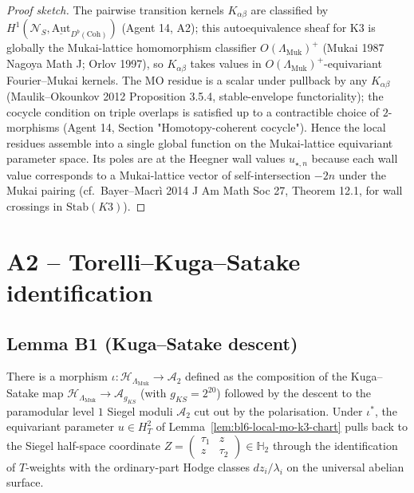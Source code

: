 \begin{proof}[Proof sketch]
The pairwise transition kernels $K_{\alpha \beta}$ are classified
by $H^{1}(\mathcal N_{S}, \underline{\mathrm{Aut}}_{D^{b}(\mathrm{Coh})})$
(Agent 14, A2); this autoequivalence sheaf for K3 is globally the
Mukai-lattice homomorphism classifier
$O(\Lambda_{\mathrm{Muk}})^{+}$ (Mukai 1987 Nagoya Math J; Orlov
1997), so $K_{\alpha \beta}$ takes values in
$O(\Lambda_{\mathrm{Muk}})^{+}$-equivariant Fourier--Mukai kernels.
The MO residue is a scalar under pullback by any
$K_{\alpha \beta}$ (Maulik--Okounkov 2012 Proposition 3.5.4,
stable-envelope functoriality); the cocycle condition on triple
overlaps is satisfied up to a contractible choice of $2$-morphisms
(Agent 14, Section "Homotopy-coherent cocycle").  Hence the local
residues assemble into a single global function on the Mukai-lattice
equivariant parameter space.  Its poles are at the Heegner wall
values $u_{\star, n}$ because each wall value corresponds to a
Mukai-lattice vector of self-intersection $-2n$ under the Mukai
pairing (cf.\ Bayer--Macr\`i 2014 J Am Math Soc 27, Theorem 12.1,
for wall crossings in $\mathrm{Stab}(K3)$).
\end{proof}

\section*{A2 -- Torelli--Kuga--Satake identification}

\subsection*{Lemma B1 (Kuga--Satake descent)}

\begin{lemma}
\label{lem:bl6-kuga-satake-pullback}
There is a morphism $\iota\colon
\mathcal H_{\Lambda_{\mathrm{Muk}}} \to \mathcal A_{2}$
defined as the composition of the Kuga--Satake map
$\mathcal H_{\Lambda_{\mathrm{Muk}}} \to \mathcal A_{g_{KS}}$
(with $g_{KS} = 2^{20}$) followed by the descent to the
paramodular level $1$ Siegel moduli $\mathcal A_{2}$ cut out by the
polarisation.  Under $\iota^{*}$, the equivariant parameter
$u \in H^{2}_{T}$ of Lemma~\ref{lem:bl6-local-mo-k3-chart} pulls
back to the Siegel half-space coordinate
$Z = \begin{pmatrix} \tau_{1} & z \\ z & \tau_{2} \end{pmatrix}
\in \mathbb H_{2}$ through the identification of $T$-weights with
the ordinary-part Hodge classes $dz_{i}/\lambda_{i}$ on the
universal abelian surface.
\end{lemma}

